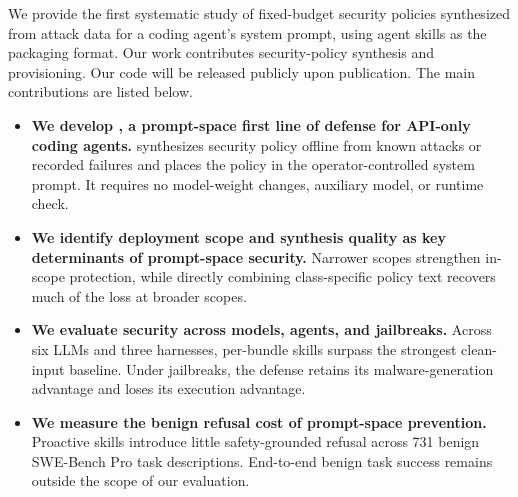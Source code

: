 We provide the first systematic study of fixed-budget security policies synthesized from attack data for a coding agent's system prompt, using agent skills as the packaging format. Our work contributes security-policy synthesis and provisioning. Our code will be released publicly upon publication. The main contributions are listed below.
\begin{itemize}[leftmargin=*, itemsep=2pt]
\item \textbf{We develop \sysname, a prompt-space first line of defense for API-only coding agents.} \sysname synthesizes security policy offline from known attacks or recorded failures and places the policy in the operator-controlled system prompt. It requires no model-weight changes, auxiliary model, or runtime check.

\item \textbf{We identify deployment scope and synthesis quality as key determinants of prompt-space security.} Narrower scopes strengthen in-scope protection, while directly combining class-specific policy text recovers much of the loss at broader scopes.

\item \textbf{We evaluate security across models, agents, and jailbreaks.} Across six LLMs and three harnesses, per-bundle skills surpass the strongest clean-input baseline. Under jailbreaks, the defense retains its malware-generation advantage and loses its execution advantage.

\item \textbf{We measure the benign refusal cost of prompt-space prevention.} Proactive skills introduce little safety-grounded refusal across 731 benign SWE-Bench Pro task descriptions. End-to-end benign task success remains outside the scope of our evaluation.
\end{itemize}
